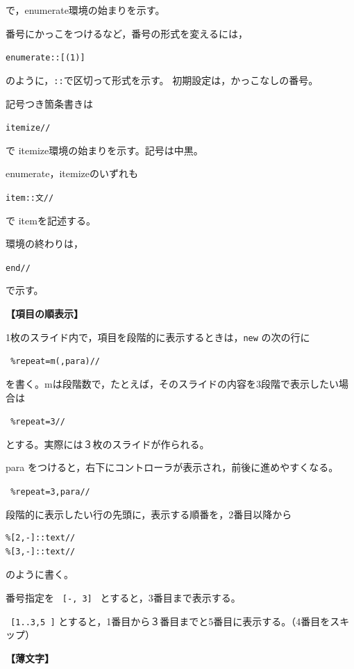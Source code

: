 \documentclass[papersize,a4paper,12pt,uplatex]{jsarticle}
\begin{document}
 で，enumerate環境の始まりを示す。

番号にかっこをつけるなど，番号の形式を変えるには，

\hspace{10mm}\verb|enumerate::[(1)]|

のように，\verb|::|で区切って形式を示す。 初期設定は，かっこなしの番号。

記号つき箇条書きは

\hspace{10mm}\verb|itemize//|
 
で itemize環境の始まりを示す。記号は中黒。

enumerate，itemizeのいずれも

\hspace{10mm}\verb|item::文//|
 
で itemを記述する。

環境の終わりは，

\hspace{10mm}\verb|end//|

で示す。

\vspace{\baselineskip}
{\bf 【項目の順表示】}

1枚のスライド内で，項目を段階的に表示するときは，\verb|new| の次の行に

\hspace{10mm}\verb| %repeat=m(,para)//|

を書く。mは段階数で，たとえば，そのスライドの内容を3段階で表示したい場合は

\hspace{10mm}\verb| %repeat=3//|

とする。実際には３枚のスライドが作られる。

para をつけると，右下にコントローラが表示され，前後に進めやすくなる。

\hspace{10mm}\verb| %repeat=3,para//|

段階的に表示したい行の先頭に，表示する順番を，2番目以降から
\begin{verbatim}
%[2,-]::text//
%[3,-]::text//
\end{verbatim}

のように書く。
 
番号指定を \verb| [-, 3] | とすると，3番目まで表示する。

\verb| [1..3,5 ]| とすると，1番目から３番目までと5番目に表示する。（4番目をスキップ）

\vspace{\baselineskip}
 {\bf 【薄文字】}
 
\end{document}

